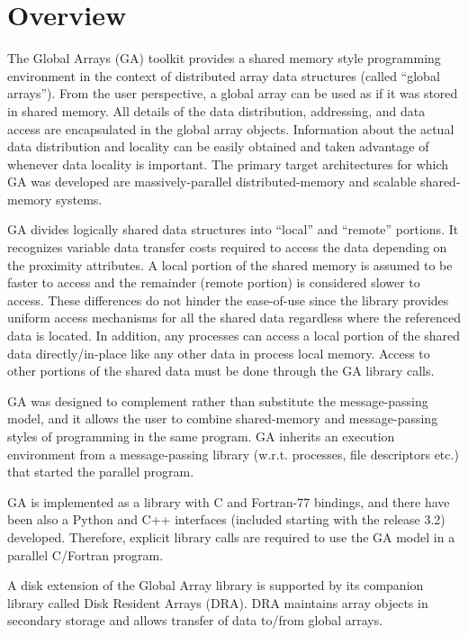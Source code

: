 \section{Overview}

The Global Arrays (GA) toolkit provides a shared memory style programming
environment in the context of distributed array data structures (called
``global arrays''). From the user perspective, a global array can be used as if
it was stored in shared memory. All details of the data distribution,
addressing, and data access are encapsulated in the global array objects.
Information about the actual data distribution and locality can be easily
obtained and taken advantage of whenever data locality is important. The
primary target architectures for which GA was developed are massively-parallel
distributed-memory and scalable shared-memory systems. 

GA divides logically shared data structures into ``local'' and ``remote''
portions. It recognizes variable data transfer costs required to access the
data depending on the proximity attributes. A local portion of the shared
memory is assumed to be faster to access and the remainder (remote portion) is
considered slower to access. These differences do not hinder the ease-of-use
since the library provides uniform access mechanisms for all the shared data
regardless where the referenced data is located. In addition, any processes can
access a local portion of the shared data directly/in-place like any other data
in process local memory. Access to other portions of the shared data must be
done through the GA library calls. 

GA was designed to complement rather than substitute the message-passing model,
and it allows the user to combine shared-memory and message-passing styles of
programming in the same program. GA inherits an execution environment from a
message-passing library (w.r.t. processes, file descriptors etc.) that started
the parallel program. 

GA is implemented as a library with C and Fortran-77 bindings, and there have
been also a Python and C++ interfaces (included starting with the release 3.2)
developed. Therefore, explicit library calls are required to use the GA model
in a parallel C/Fortran program. 

A disk extension of the Global Array library is supported by its companion
library called Disk Resident Arrays (DRA). DRA maintains array objects in
secondary storage and allows transfer of data to/from global arrays. 

